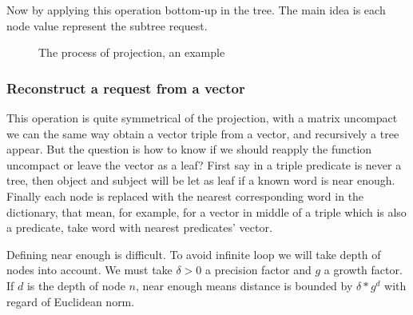 Now by applying this operation bottom-up in the tree. The main idea is each node value represent the subtree request.

\begin{figure}
\begin{center}
\caption{The process of projection, an example}
\end{center}
\end{figure}

\subsubsection{Reconstruct a request from a vector}

This operation is quite symmetrical of the projection, with a matrix uncompact we can the same way obtain a vector triple from a vector, and recursively a tree appear. But the question is how to know if we should reapply the function uncompact or leave the vector as a leaf? First say in a triple predicate is never a tree, then object and subject will be let as leaf if a known word is near enough. Finally each node is replaced with the nearest corresponding word in the dictionary, that mean, for example, for a vector in middle of a triple which is also a predicate, take word with nearest predicates' vector.

Defining near enough is difficult. To avoid infinite loop we will take depth of nodes into account. We must take $\delta>0$ a precision factor and $g$ a growth factor. If $d$ is the depth of node $n$, near enough means distance is bounded by $\delta*g^d$ with regard of Euclidean norm.  

